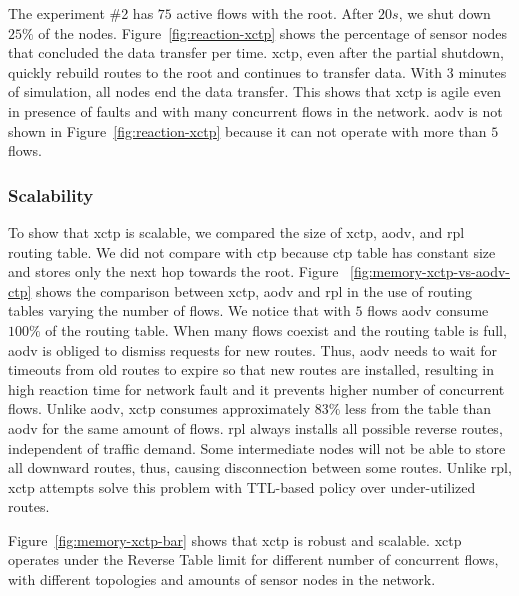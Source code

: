 The experiment \#2 has $75$ active flows with the root. After $20s$, we shut
down $25\%$ of the nodes. Figure~\ref{fig:reaction-xctp} shows the percentage of sensor nodes that concluded the data transfer per time.
\ac{xctp}, even after the partial shutdown, quickly rebuild
routes to the root and continues to transfer data. With $3$ minutes of
simulation, all nodes end the data transfer. This shows that \ac{xctp} is agile
even in presence of faults and with many concurrent flows in the network.
\ac{aodv} is not shown in Figure~\ref{fig:reaction-xctp} because it can not
operate with more than $5$ flows.

\subsubsection{Scalability}
\label{sec:scalability}


To show that \ac{xctp} is scalable, we compared the size of
\ac{xctp}, \ac{aodv}, and \ac{rpl} routing table. We
did not compare with \ac{ctp} because \ac{ctp} table has constant size and
stores only the next hop towards the root. Figure
~\ref{fig:memory-xctp-vs-aodv-ctp}
 shows the comparison between \ac{xctp}, \ac{aodv} and \ac{rpl} in the use of routing tables
varying the number of flows. We notice that with $5$ flows \ac{aodv} consume
$100\%$ of the routing table. When many flows coexist and the routing table is
full, \ac{aodv} is obliged to dismiss requests for new routes. Thus, \ac{aodv}
needs to wait for timeouts from old routes to expire so that new routes are
installed, resulting in high reaction time for network fault and it prevents
higher number of concurrent flows. Unlike \ac{aodv}, \ac{xctp} consumes
approximately $83\% $ less from the table than \ac{aodv} for the same
amount of flows. \ac{rpl} always installs all possible reverse routes, independent of traffic demand. Some intermediate nodes will not be able to store all downward routes, thus, causing disconnection between some routes. Unlike \ac{rpl}, \ac{xctp} attempts solve this problem with TTL-based policy over under-utilized routes.

Figure~\ref{fig:memory-xctp-bar} shows that \ac{xctp} is robust and scalable.
\ac{xctp} operates under the Reverse Table limit for different number of
concurrent flows, with different topologies and amounts of sensor nodes in the
network.

